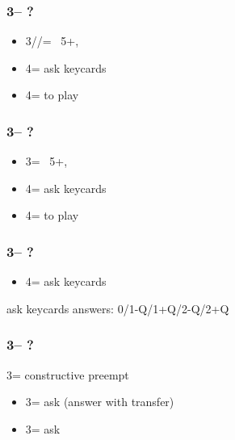 \documentclass[12pt, a4paper]{report}
\begin{document}
{{{            \subsubsection*{3\clubs -- ?}
            \begin{itemize}
                \item 3\diams/\hearts/\spades = \nat\ 5+, \gf
                \item 4\diams = ask keycards
                \item 4\major = to play
            \end{itemize}

            \subsubsection*{3\diams -- ?}
            \begin{itemize}
                \item 3\major = \nat\ 5+, \gf
                \item 4\clubs = ask keycards
                \item 4\major = to play
            \end{itemize}

            \subsubsection*{3\major -- ?}
            \begin{itemize}
                \item 4\clubs = ask keycards
            \end{itemize}

            \vspace{0.5cm}
            ask keycards answers: 0/1-Q/1+Q/2-Q/2+Q
            \vspace{0.4cm}

            \subsubsection*{3\nt -- ?}
            3\nt = constructive \major preempt
            \begin{itemize}
                \item 3\clubs = ask (answer with transfer)
                \item 3\diams = ask
            \end{itemize}
        }

    }

}
\end{document}
